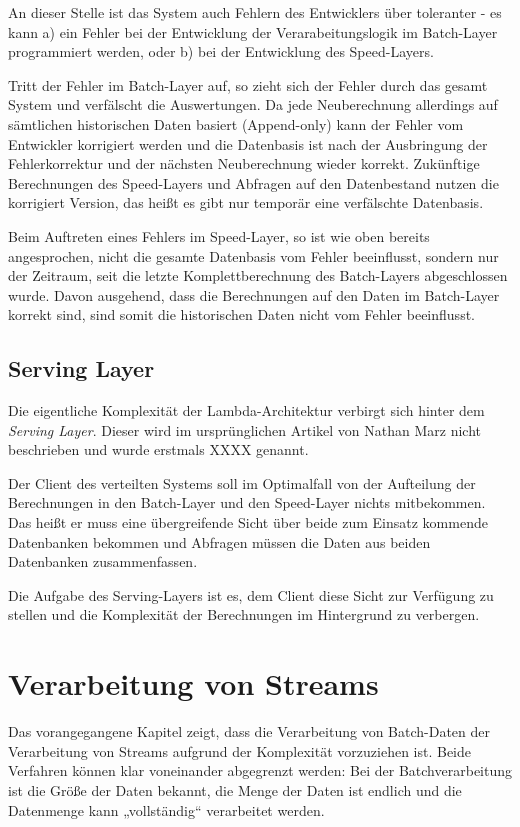 \documentclass[a4paper,11pt]{scrartcl}
\begin{document}
An dieser Stelle ist das System auch Fehlern des Entwicklers über toleranter -
es kann a) ein Fehler bei der Entwicklung der Verarabeitungslogik im
Batch-Layer programmiert werden, oder b) bei der Entwicklung des Speed-Layers.

Tritt der Fehler im Batch-Layer auf, so zieht sich der Fehler durch das gesamt
System und verfälscht die Auswertungen. Da jede Neuberechnung allerdings auf
sämtlichen historischen Daten basiert (Append-only) kann der Fehler vom
Entwickler korrigiert werden und die Datenbasis ist nach der Ausbringung der
Fehlerkorrektur und der nächsten Neuberechnung wieder korrekt. Zukünftige
Berechnungen des Speed-Layers und Abfragen auf den Datenbestand nutzen die
korrigiert Version, das heißt es gibt nur temporär eine verfälschte Datenbasis.

Beim Auftreten eines Fehlers im Speed-Layer, so ist wie oben bereits
angesprochen, nicht die gesamte Datenbasis vom Fehler beeinflusst, sondern nur
der Zeitraum, seit die letzte Komplettberechnung des Batch-Layers abgeschlossen
wurde. Davon ausgehend, dass die Berechnungen auf den Daten im Batch-Layer
korrekt sind, sind somit die historischen Daten nicht vom Fehler beeinflusst.

\subsection{Serving Layer}
Die eigentliche Komplexität der Lambda-Architektur verbirgt sich hinter dem
\textit{Serving Layer}. Dieser wird im ursprünglichen Artikel von Nathan Marz
nicht beschrieben und wurde erstmals XXXX genannt. 

Der Client des verteilten Systems soll im Optimalfall von der Aufteilung der
Berechnungen in den Batch-Layer und den Speed-Layer nichts mitbekommen. Das
heißt er muss eine übergreifende Sicht über beide zum Einsatz kommende
Datenbanken bekommen und Abfragen müssen die Daten aus beiden Datenbanken
zusammenfassen.

Die Aufgabe des Serving-Layers ist es, dem Client diese Sicht zur Verfügung zu
stellen und die Komplexität der Berechnungen im Hintergrund zu verbergen.

\section{Verarbeitung von Streams}
Das vorangegangene Kapitel zeigt, dass die Verarbeitung von Batch-Daten der
Verarbeitung von Streams aufgrund der Komplexität vorzuziehen ist. Beide
Verfahren können klar voneinander abgegrenzt werden: Bei der Batchverarbeitung
ist die Größe der Daten bekannt, die Menge der Daten ist endlich und die
Datenmenge kann „vollständig“ verarbeitet werden.
\end{document}
